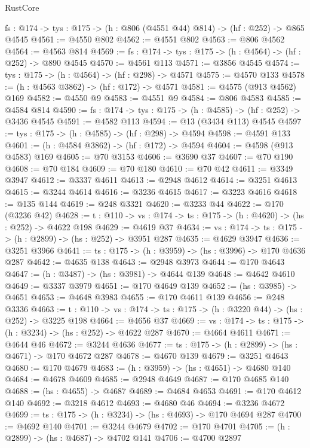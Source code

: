 \begin{lexlean}{RustCore}
\begin{coremodule}
  {fs : @174} -> {tys : @175} -> (h : @806 (@4551 @44) @814) -> (hf : @252) -> @865 @4545
@4561 := @4550 @802
@4562 := @4551 @802
@4563 := @806 @4562
@4564 := @4563 @814
@4569 := {fs : @174} -> {tys : @175} -> (h : @4564) -> (hf : @252) -> @890 @4545
@4570 := @4561 @113
@4571 := @3856 @4545
@4574 := {tys : @175} -> (h : @4564) -> (hf : @298) -> @4571
@4575 := @4570 @133
@4578 := (h : @4563 @3862) -> (hf : @172) -> @4571
@4581 := @4575 (@913 @4562) @169
@4582 := @4550 @9
@4583 := @4551 @9
@4584 := @806 @4583
@4585 := @4584 @814
@4590 := {fs : @174} -> {tys : @175} -> (h : @4585) -> (hf : @252) -> @3436 @4545
@4591 := @4582 @113
@4594 := @13 (@3434 @113) @4545
@4597 := {tys : @175} -> (h : @4585) -> (hf : @298) -> @4594
@4598 := @4591 @133
@4601 := (h : @4584 @3862) -> (hf : @172) -> @4594
@4604 := @4598 (@913 @4583) @169
@4605 := @70 @3153
@4606 := @3690 @37
@4607 := @70 @190
@4608 := @70 @184
@4609 := @70 @180
@4610 := @70 @42
@4611 := @3349 @3947
@4612 := @3337 @4611
@4613 := @2948 @4612
@4614 := @3251 @4613
@4615 := @3244 @4614
@4616 := @3236 @4615
@4617 := @3223 @4616
@4618 := @135 @144
@4619 := @248 @3321
@4620 := @3233 @44
@4622 := @170 (@3236 @42)
@4628 := {t : @110} -> {vs : @174} -> {ts : @175} -> (h : @4620) -> (hs : @252) -> @4622 @198
@4629 := @4619 @37
@4634 := {vs : @174} -> {ts : @175} -> (h : @2899) -> (hs : @252) -> @3951 @287
@4635 := @4629 @3947
@4636 := @3251 @3966
@4641 := {ts : @175} -> (h : @3959) -> (hs : @3996) -> @170 @4636 @287
@4642 := @4635 @138
@4643 := @2948 @3973
@4644 := @170 @4643
@4647 := (h : @3487) -> (hs : @3981) -> @4644 @139
@4648 := @4642 @4610
@4649 := @3337 @3979
@4651 := @170 @4649 @139
@4652 := (hs : @3985) -> @4651
@4653 := @4648 @3983
@4655 := @170 @4611 @139
@4656 := @248 @3336
@4663 := {t : @110} -> {vs : @174} -> {ts : @175} -> (h : @3220 @44) -> (hs : @252) -> @3225 @198
@4664 := @4656 @37
@4669 := {vs : @174} -> {ts : @175} -> (h : @3234) -> (hs : @252) -> @4622 @287
@4670 := @4664 @4611
@4671 := @4644 @46
@4672 := @3244 @4636
@4677 := {ts : @175} -> (h : @2899) -> (hs : @4671) -> @170 @4672 @287
@4678 := @4670 @139
@4679 := @3251 @4643
@4680 := @170 @4679
@4683 := (h : @3959) -> (hs : @4651) -> @4680 @140
@4684 := @4678 @4609
@4685 := @2948 @4649
@4687 := @170 @4685 @140
@4688 := (hs : @4655) -> @4687
@4689 := @4684 @4653
@4691 := @170 @4612 @140
@4692 := @3218 @4612
@4693 := @4680 @46
@4694 := @3236 @4672
@4699 := {ts : @175} -> (h : @3234) -> (hs : @4693) -> @170 @4694 @287
@4700 := @4692 @140
@4701 := @3244 @4679
@4702 := @170 @4701
@4705 := (h : @2899) -> (hs : @4687) -> @4702 @141
@4706 := @4700 @2897

\end{coremodule}
\end{lexlean}
